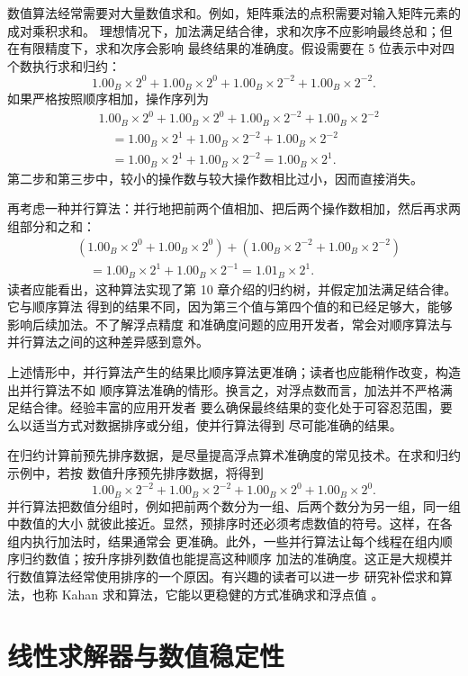 数值算法经常需要对大量数值求和。例如，矩阵乘法的点积需要对输入矩阵元素的成对乘积求和。
理想情况下，加法满足结合律，求和次序不应影响最终总和；但在有限精度下，求和次序会影响
最终结果的准确度。假设需要在 5 位表示中对四个数执行求和归约：
\[
  1.00_B\times2^0+1.00_B\times2^0+1.00_B\times2^{-2}+1.00_B\times2^{-2}.
\]
如果严格按照顺序相加，操作序列为
\begin{align*}
  &1.00_B\times2^0+1.00_B\times2^0+1.00_B\times2^{-2}+1.00_B\times2^{-2}\\
  &\quad=1.00_B\times2^1+1.00_B\times2^{-2}+1.00_B\times2^{-2}\\
  &\quad=1.00_B\times2^1+1.00_B\times2^{-2}
   =1.00_B\times2^1.
\end{align*}
第二步和第三步中，较小的操作数与较大操作数相比过小，因而直接消失。

再考虑一种并行算法：并行地把前两个值相加、把后两个操作数相加，然后再求两组部分和之和：
\begin{align*}
  &(1.00_B\times2^0+1.00_B\times2^0)
    +(1.00_B\times2^{-2}+1.00_B\times2^{-2})\\
  &\quad=1.00_B\times2^1+1.00_B\times2^{-1}
   =1.01_B\times2^1.
\end{align*}
读者应能看出，这种算法实现了第 10 章介绍的归约树，并假定加法满足结合律。它与顺序算法
得到的结果不同，因为第三个值与第四个值的和已经足够大，能够影响后续加法。不了解浮点精度
和准确度问题的应用开发者，常会对顺序算法与并行算法之间的这种差异感到意外。

上述情形中，并行算法产生的结果比顺序算法更准确；读者也应能稍作改变，构造出并行算法不如
顺序算法准确的情形。换言之，对浮点数而言，加法并不严格满足结合律。经验丰富的应用开发者
要么确保最终结果的变化处于可容忍范围，要么以适当方式对数据排序或分组，使并行算法得到
尽可能准确的结果。

在归约计算前预先排序数据，是尽量提高浮点算术准确度的常见技术。在求和归约示例中，若按
数值升序预先排序数据，将得到
\[
  1.00_B\times2^{-2}+1.00_B\times2^{-2}+1.00_B\times2^0+1.00_B\times2^0.
\]
并行算法把数值分组时，例如把前两个数分为一组、后两个数分为另一组，同一组中数值的大小
就彼此接近。显然，预排序时还必须考虑数值的符号。这样，在各组内执行加法时，结果通常会
更准确。此外，一些并行算法让每个线程在组内顺序归约数值；按升序排列数值也能提高这种顺序
加法的准确度。这正是大规模并行数值算法经常使用排序的一个原因。有兴趣的读者可以进一步
研究补偿求和算法，也称 Kahan 求和算法，它能以更稳健的方式准确求和浮点值
\cite{appa-kahan}。

\section{线性求解器与数值稳定性}
\label{sec:appa-linear-solvers}

